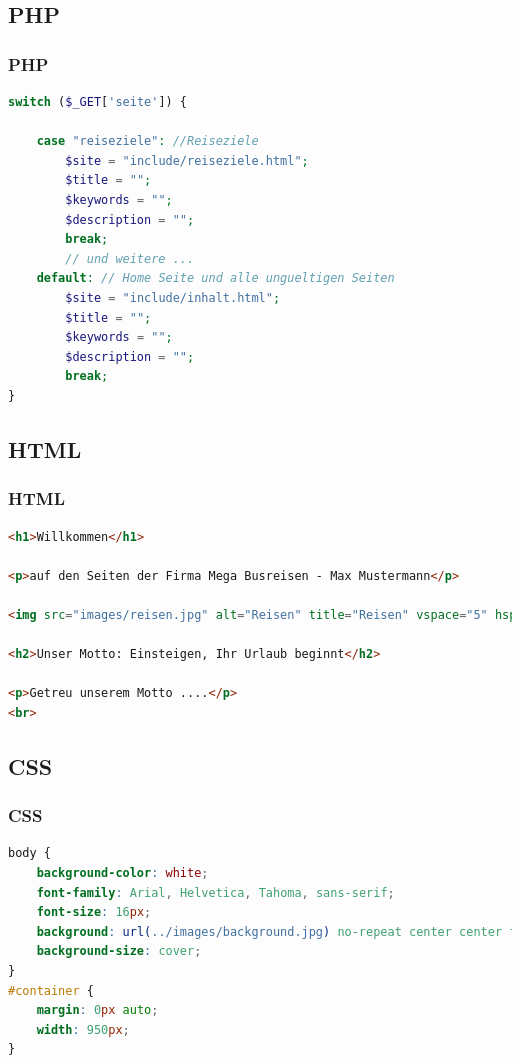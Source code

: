\documentclass[xcolor=dvipsnames]{beamer}
\begin{document}
\subsection{PHP}
\begin{frame}[fragile]
\frametitle{PHP}

\begin{lstlisting}[language=PHP]
switch ($_GET['seite']) {

    case "reiseziele": //Reiseziele
        $site = "include/reiseziele.html";
        $title = "";
        $keywords = "";
        $description = "";
        break;
        // und weitere ...
    default: // Home Seite und alle ungueltigen Seiten
        $site = "include/inhalt.html";
        $title = "";
        $keywords = "";
        $description = "";
        break;
}

\end{lstlisting}
\end{frame}

\subsection{HTML}
\begin{frame}[fragile]
\frametitle{HTML}

\begin{lstlisting}[language=HTML]
<h1>Willkommen</h1>

<p>auf den Seiten der Firma Mega Busreisen - Max Mustermann</p>

<img src="images/reisen.jpg" alt="Reisen" title="Reisen" vspace="5" hspace="5" align="left">

<h2>Unser Motto: Einsteigen, Ihr Urlaub beginnt</h2>

<p>Getreu unserem Motto ....</p>
<br>

\end{lstlisting}
\end{frame}

\subsection{CSS}
\begin{frame}[fragile]
\frametitle{CSS}

\begin{lstlisting}[language=CSS]
body {
    background-color: white;
    font-family: Arial, Helvetica, Tahoma, sans-serif;
    font-size: 16px;
    background: url(../images/background.jpg) no-repeat center center fixed;
    background-size: cover;
}
#container {
    margin: 0px auto;
    width: 950px;
}

\end{lstlisting}
\end{frame}
\end{document}
